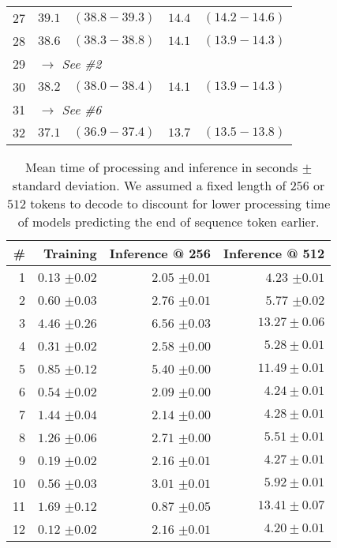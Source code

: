 \documentclass{article}
\begin{document}
\begin{table}[b]
\begin{tabular}{rrrrr}
    27 & $39.1$ & $(38.8-39.3)$ & $14.4$ & $(14.2-14.6)$ \\
    28 & $38.6$ & $(38.3-38.8)$ & $14.1$ & $(13.9-14.3)$ \\
    29 & \multicolumn{4}{l}{\textit{$\rightarrow$ See  \#2}} \\
    30 & $38.2$ & $(38.0-38.4)$ & $14.1$ & $(13.9-14.3)$ \\
    31 & \multicolumn{4}{l}{\textit{$\rightarrow$ See  \#6}} \\
    32 & $37.1$ & $(36.9-37.4)$ & $13.7$ & $(13.5-13.8)$ \\



    \bottomrule
    \end{tabular}
\end{table}


\begin{table}
    \caption{Mean time of processing and inference in seconds $\pm$ standard deviation. We assumed a fixed length of $256$ or $512$ tokens to decode to discount for lower processing time of models predicting the end of sequence token earlier.}
    \label{tab:timeci}
    \small
    \centering
\begin{tabular}{rrrr}
    \toprule
    \# & Training & Inference @ 256 & Inference @ 512 \\
    \midrule
    1 & $0.13$ $\pm 0.02$ & $2.05$ $\pm 0.01$ & $4.23$ $\pm 0.01$ \\ 2 & $0.60$ $\pm 0.03$ & $2.76$ $\pm 0.01$ & $5.77$ $\pm 0.02$ \\ 3 & $4.46$ $\pm 0.26$ & $6.56$ $\pm 0.03$ & $13.27 \pm 0.06$ \\ 4 & $0.31$ $\pm 0.02$ & $2.58$ $\pm 0.00$ & $5.28 \pm 0.01$ \\ 5 & $0.85$ $\pm 0.12$ & $5.40$ $\pm 0.00$ & $11.49 \pm 0.01$ \\ 6 & $0.54$ $\pm 0.02$ & $2.09$ $\pm 0.00$ & $4.24 \pm 0.01$ \\ 7 & $1.44$ $\pm 0.04$ & $2.14$ $\pm 0.00$ & $4.28 \pm 0.01$ \\ 8 & $1.26$ $\pm 0.06$ & $2.71$ $\pm 0.00$ & $5.51 \pm 0.01$ \\ 9 & $0.19$ $\pm 0.02$ & $2.16$ $\pm 0.01$ & $4.27 \pm 0.01$ \\
    10 & $0.56$ $\pm 0.03$ & $3.01$ $\pm 0.01$ & $5.92 \pm 0.01$ \\
    11 & $1.69$ $\pm 0.12$ & $0.87$ $\pm 0.05$ & $13.41 \pm 0.07$ \\
    12 & $0.12$ $\pm 0.02$ & $2.16$ $\pm 0.01$ & $4.20 \pm 0.01$ \\

\end{tabular}
\end{table}
\end{document}
